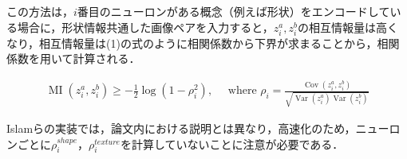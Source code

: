 この方法は，$i$番目のニューロンがある概念（例えば形状）をエンコードしている場合に，形状情報共通した画像ペアを入力すると，$z^a_i, z^b_i$の相互情報量は高くなり，相互情報量は(1)の式のように相関係数から下界が求まることから，相関係数を用いて計算される．

\begin{align}
\operatorname{MI}\left(z_i^a, z_i^b\right) \geq-\frac{1}{2} \log \left(1-\rho_i^2\right), \quad \text { where } \rho_i=\frac{\operatorname{Cov}\left(z_i^a, z_i^b\right)}{\sqrt{\operatorname{Var}\left(z_i^a\right) \operatorname{Var}\left(z_i^b\right)}}
\end{align}

Islamらの実装では，論文内における説明とは異なり，高速化のため，ニューロンごとに$\rho_i^{shape}$，$\rho_i^{texture}$を計算していないことに注意が必要である．
    
\newpage